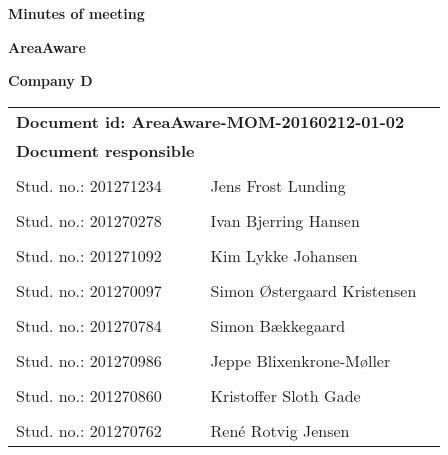 
\centerline{\Huge\bfseries\color{ThemeColor} Minutes of meeting}

\vspace{1em}
\centerline{\Large\bfseries\color{BlackColor} AreaAware}

\vspace{5em}
\centerline{\large\bfseries\color{BlackColor}Company D}




\begin{center}
   \begin{tabular}{ *{2}l p{6cm} }
   \multicolumn{2}{l}{\textbf{Document id: AreaAware-MOM-20160212-01-02}} & \\
   \textbf{Document responsible} &  & \\
   & & \\
   Stud. no.: 201271234 & Jens Frost Lunding & \\\hline
   & & \\
   Stud. no.: 201270278 & Ivan Bjerring Hansen & \\\hline
   & & \\
   Stud. no.: 201271092 & Kim Lykke Johansen & \\\hline
   & & \\
   Stud. no.: 201270097 & Simon Østergaard Kristensen & \\\hline
   & & \\
   Stud. no.: 201270784  & Simon Bækkegaard & \\\hline
   & & \\
   Stud. no.:  201270986 & Jeppe Blixenkrone-Møller & \\\hline
   & & \\
   Stud. no.:  201270860 & Kristoffer Sloth Gade & \\\hline
   & & \\
   Stud. no.:  201270762 & René Rotvig Jensen & \\\hline
   \end{tabular}
\end{center}
\thispagestyle{empty} %
\restoregeometry


